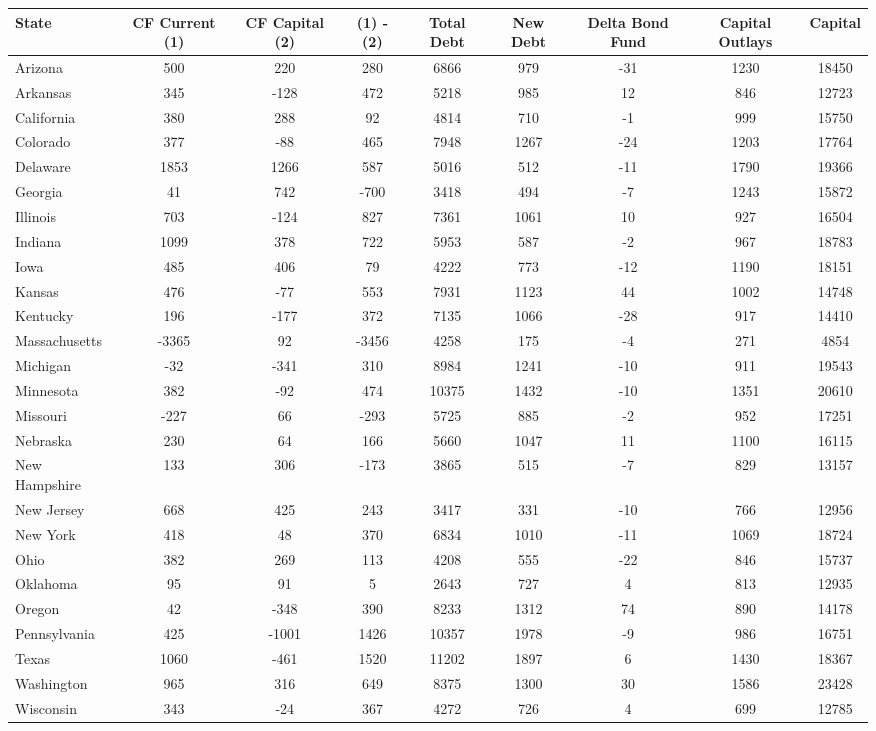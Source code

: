 
\begin{tabularx}{\linewidth}{@{}lCCCCCCCC@{}}

\toprule
{State}&{CF Current (1)}&{CF Capital (2)}&{(1) - (2)}&{Total Debt}&{New Debt}&{Delta Bond Fund}&{Capital Outlays}&{Capital} \tabularnewline
\midrule \addlinespace[\belowrulesep]
Arizona&500&220&280&6866&979&-31&1230&18450 \tabularnewline
Arkansas&345&-128&472&5218&985&12&846&12723 \tabularnewline
California&380&288&92&4814&710&-1&999&15750 \tabularnewline
Colorado&377&-88&465&7948&1267&-24&1203&17764 \tabularnewline
Delaware&1853&1266&587&5016&512&-11&1790&19366 \tabularnewline
Georgia&41&742&-700&3418&494&-7&1243&15872 \tabularnewline
Illinois&703&-124&827&7361&1061&10&927&16504 \tabularnewline
Indiana&1099&378&722&5953&587&-2&967&18783 \tabularnewline
Iowa&485&406&79&4222&773&-12&1190&18151 \tabularnewline
Kansas&476&-77&553&7931&1123&44&1002&14748 \tabularnewline
Kentucky&196&-177&372&7135&1066&-28&917&14410 \tabularnewline
Massachusetts&-3365&92&-3456&4258&175&-4&271&4854 \tabularnewline
Michigan&-32&-341&310&8984&1241&-10&911&19543 \tabularnewline
Minnesota&382&-92&474&10375&1432&-10&1351&20610 \tabularnewline
Missouri&-227&66&-293&5725&885&-2&952&17251 \tabularnewline
Nebraska&230&64&166&5660&1047&11&1100&16115 \tabularnewline
New Hampshire&133&306&-173&3865&515&-7&829&13157 \tabularnewline
New Jersey&668&425&243&3417&331&-10&766&12956 \tabularnewline
New York&418&48&370&6834&1010&-11&1069&18724 \tabularnewline
Ohio&382&269&113&4208&555&-22&846&15737 \tabularnewline
Oklahoma&95&91&5&2643&727&4&813&12935 \tabularnewline
Oregon&42&-348&390&8233&1312&74&890&14178 \tabularnewline
Pennsylvania&425&-1001&1426&10357&1978&-9&986&16751 \tabularnewline
Texas&1060&-461&1520&11202&1897&6&1430&18367 \tabularnewline
Washington&965&316&649&8375&1300&30&1586&23428 \tabularnewline
Wisconsin&343&-24&367&4272&726&4&699&12785 \tabularnewline
\bottomrule 

\end{tabularx}
